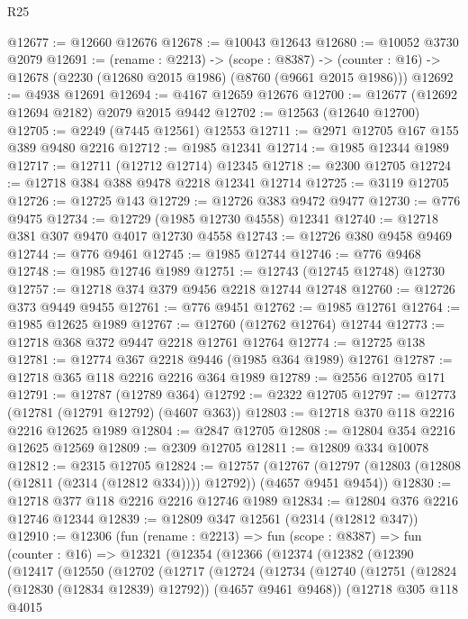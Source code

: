 \begin{lexlean}{R25}
\begin{coremodule}
@12677 := @12660 @12676
@12678 := @10043 @12643
@12680 := @10052 @3730 @2079
@12691 := (rename : @2213) ->
  (scope : @8387) ->
  (counter : @16) -> @12678 (@2230 (@12680 @2015 @1986) (@8760 (@9661 @2015 @1986)))
@12692 := @4938 @12691
@12694 := @4167 @12659 @12676
@12700 := @12677 (@12692 @12694 @2182) @2079 @2015 @9442
@12702 := @12563 (@12640 @12700)
@12705 := @2249 (@7445 @12561) @12553
@12711 := @2971 @12705 @167 @155 @389 @9480 @2216
@12712 := @1985 @12341
@12714 := @1985 @12344 @1989
@12717 := @12711 (@12712 @12714) @12345
@12718 := @2300 @12705
@12724 := @12718 @384 @388 @9478 @2218 @12341 @12714
@12725 := @3119 @12705
@12726 := @12725 @143
@12729 := @12726 @383 @9472 @9477
@12730 := @776 @9475
@12734 := @12729 (@1985 @12730 @4558) @12341
@12740 := @12718 @381 @307 @9470 @4017 @12730 @4558
@12743 := @12726 @380 @9458 @9469
@12744 := @776 @9461
@12745 := @1985 @12744
@12746 := @776 @9468
@12748 := @1985 @12746 @1989
@12751 := @12743 (@12745 @12748) @12730
@12757 := @12718 @374 @379 @9456 @2218 @12744 @12748
@12760 := @12726 @373 @9449 @9455
@12761 := @776 @9451
@12762 := @1985 @12761
@12764 := @1985 @12625 @1989
@12767 := @12760 (@12762 @12764) @12744
@12773 := @12718 @368 @372 @9447 @2218 @12761 @12764
@12774 := @12725 @138
@12781 := @12774 @367 @2218 @9446 (@1985 @364 @1989) @12761
@12787 := @12718 @365 @118 @2216 @2216 @364 @1989
@12789 := @2556 @12705 @171
@12791 := @12787 (@12789 @364)
@12792 := @2322 @12705
@12797 := @12773 (@12781 (@12791 @12792) (@4607 @363))
@12803 := @12718 @370 @118 @2216 @2216 @12625 @1989
@12804 := @2847 @12705
@12808 := @12804 @354 @2216 @12625 @12569
@12809 := @2309 @12705
@12811 := @12809 @334 @10078
@12812 := @2315 @12705
@12824 := @12757
    (@12767 (@12797 (@12803 (@12808 (@12811 (@2314 (@12812 @334)))) @12792)) (@4657 @9451 @9454))
@12830 := @12718 @377 @118 @2216 @2216 @12746 @1989
@12834 := @12804 @376 @2216 @12746 @12344
@12839 := @12809 @347 @12561 (@2314 (@12812 @347))
@12910 := @12306
    (fun (rename : @2213) =>
    fun (scope : @8387) =>
    fun (counter : @16) =>
    @12321
      (@12354
        (@12366
          (@12374
            (@12382
              (@12390
                (@12417
                  (@12550
                    (@12702
                      (@12717
                        (@12724
                          (@12734
                            (@12740
                              (@12751 (@12824 (@12830 (@12834 @12839) @12792)) (@4657 @9461 @9468))
                              (@12718
                                @305
                                @118
                                @4015

\end{coremodule}
\end{lexlean}
